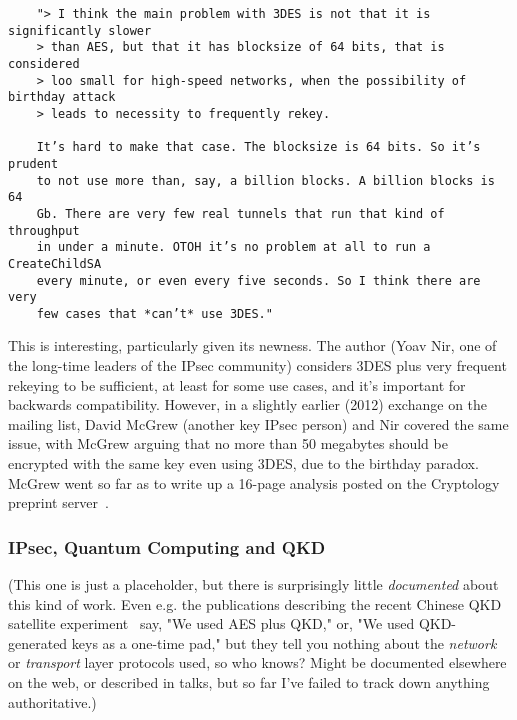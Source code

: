 \begin{widetext}
\begin{verbatim}
	"> I think the main problem with 3DES is not that it is significantly slower
	> than AES, but that it has blocksize of 64 bits, that is considered
	> loo small for high-speed networks, when the possibility of birthday attack
	> leads to necessity to frequently rekey.

	It’s hard to make that case. The blocksize is 64 bits. So it’s prudent
	to not use more than, say, a billion blocks. A billion blocks is 64
	Gb. There are very few real tunnels that run that kind of throughput
	in under a minute. OTOH it’s no problem at all to run a CreateChildSA
	every minute, or even every five seconds. So I think there are very
	few cases that *can’t* use 3DES."
\end{verbatim}
\end{widetext}

This is interesting, particularly given its newness.  The author (Yoav
Nir, one of the long-time leaders of the IPsec community) considers
3DES plus very frequent rekeying to be sufficient, at least for some use
cases, and it's important for backwards compatibility.  However, in a
slightly earlier (2012) exchange on the mailing list, David McGrew
(another key IPsec person) and Nir covered the same issue, with McGrew
arguing that no more than 50 megabytes should be encrypted with the
same key even using 3DES, due to the birthday paradox.  McGrew went so
far as to write up a 16-page analysis posted on the Cryptology
preprint server~\cite{cryptoeprint:2012:623}.


\subsubsection{IPsec, Quantum Computing and QKD}




(This one is just a placeholder, but there is surprisingly little
\emph{documented} about this kind of work.  Even e.g. the publications
describing the recent Chinese QKD satellite
experiment~\cite{PhysRevLett.120.030501} say, "We used AES plus QKD,"
or, "We used QKD-generated keys as a one-time pad," but they tell you
nothing about the \emph{network} or \emph{transport} layer protocols
used, so who knows?  Might be documented elsewhere on the web, or
described in talks, but so far I've failed to track down anything
authoritative.)

